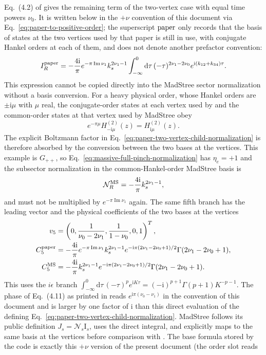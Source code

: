 \documentclass[11pt,a4paper]{article}
\newcommand{\dd}{\mathrm d}
\newcommand{\ii}{\mathrm i}
\newcommand{\cN}{\mathcal N}
\begin{document}
Eq.~(4.2) of \cite{Chen:2024jms} gives the remaining term of the two-vertex case with equal time powers $\nu_0$. It is written below in the $+\nu$ convention of this document via Eq.~\eqref{eq:paper-to-positive-order}; the superscript ${\rm paper}$ only records that the basis of states at the two vertices used by that paper is still in use, with conjugate Hankel orders at each of them, and does not denote another prefactor convention:
\begin{equation}
 I_R^{\rm paper}=-\frac{4\ii}{\pi}e^{-\pi\operatorname{Im}\nu_1}k_s^{2\nu_1-1}
 \int_{-\infty}^{0}\dd\tau\,(-\tau)^{2\nu_1-2\nu_0}
 e^{\ii(k_{12}+k_{34})\tau}.
 \label{eq:paper-two-vertex-child-normalization}
\end{equation}
This expression cannot be copied directly into the MadStree sector normalization without a basis conversion. For a heavy physical order, whose Hankel orders are $\pm\ii\mu$ with $\mu$ real, the conjugate-order states at each vertex used by \cite{Chen:2024jms} and the common-order states at that vertex used by MadStree obey
\begin{equation}
 e^{-\pi\mu}H^{(2)}_{-\ii\mu}(z)=H^{(2)}_{\ii\mu}(z).
 \label{eq:paper-endpoint-to-common-hankel-order}
\end{equation}
The explicit Boltzmann factor in Eq.~\eqref{eq:paper-two-vertex-child-normalization} is therefore absorbed by the conversion between the two bases at the vertices. This example is $G_{++}$, so Eq.~\eqref{eq:massive-full-pinch-normalization} has $\eta_e=+1$ and the subsector normalization in the common-Hankel-order MadStree basis is
\begin{equation}
 \cN_R^{\rm MS}=-\frac{4\ii}{\pi}k_s^{2\nu_1-1},
 \label{eq:madstree-common-order-child-normalization}
\end{equation}
and must not be multiplied by $e^{-\pi\operatorname{Im}\nu_1}$ again. The same fifth branch has the leading vector and the physical coefficients of the two bases at the vertices
\begin{align}
 v_5&=\left(0,\frac{1}{\nu_0-2\nu_1},\frac{1}{1-\nu_0},0,1\right)^T,
 \notag\\
 C_5^{\rm paper}&=-\frac{4\ii}{\pi}e^{-\pi\operatorname{Im}\nu_1}
 k_s^{2\nu_1-1}e^{-\ii\pi(2\nu_1-2\nu_0+1)/2}
 \Gamma(2\nu_1-2\nu_0+1),
 \notag\\
 C_5^{\rm MS}&=-\frac{4\ii}{\pi}
 k_s^{2\nu_1-1}e^{-\ii\pi(2\nu_1-2\nu_0+1)/2}
 \Gamma(2\nu_1-2\nu_0+1).
 \label{eq:paper-two-vertex-contact-boundary}
\end{align}
This uses the $i\epsilon$ branch $\int_{-\infty}^{0}\dd\tau\,(-\tau)^p e^{\ii K\tau}=(-\ii)^{p+1}\Gamma(p+1)K^{-p-1}$. The phase of Eq.~(4.11) as printed in \cite{Chen:2024jms} reads $e^{\ii\pi(\nu_0-\nu_1)}$ in the convention of this document and is larger by one factor of $\ii$ than this direct evaluation of the defining Eq.~\eqref{eq:paper-two-vertex-child-normalization}. MadStree follows its public definition $J_s=\cN_s \text{I}_s$, uses the direct integral, and explicitly maps to the same basis at the vertices before comparison with \cite{Chen:2024jms}. The base formula stored by the code is exactly this $+\nu$ version of the present document (the order slot reads
\end{document}
